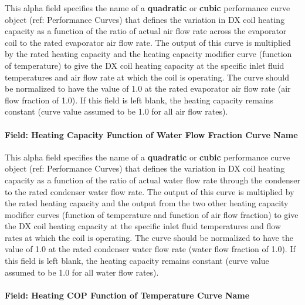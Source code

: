 This alpha field specifies the name of a \textbf{quadratic} or \textbf{cubic} performance curve object (ref: Performance Curves) that defines the variation in DX coil heating capacity as a function of the ratio of actual air flow rate across the evaporator coil to the rated evaporator air flow rate. The output of this curve is multiplied by the rated heating capacity and the heating capacity modifier curve (function of temperature) to give the DX coil heating capacity at the specific inlet fluid temperatures and air flow rate at which the coil is operating. The curve should be normalized to have the value of 1.0 at the rated evaporator air flow rate (air flow fraction of 1.0). If this field is left blank, the heating capacity remains constant (curve value assumed to be 1.0 for all air flow rates).

\paragraph{Field: Heating Capacity Function of Water Flow Fraction Curve Name}\label{field-heating-capacity-function-of-water-flow-fraction-curve-name}

This alpha field specifies the name of a \textbf{quadratic} or \textbf{cubic} performance curve object (ref: Performance Curves) that defines the variation in DX coil heating capacity as a function of the ratio of actual water flow rate through the condenser to the rated condenser water flow rate. The output of this curve is multiplied by the rated heating capacity and the output from the two other heating capacity modifier curves (function of temperature and function of air flow fraction) to give the DX coil heating capacity at the specific inlet fluid temperatures and flow rates at which the coil is operating. The curve should be normalized to have the value of 1.0 at the rated condenser water flow rate (water flow fraction of 1.0). If this field is left blank, the heating capacity remains constant (curve value assumed to be 1.0 for all water flow rates).

\paragraph{Field: Heating COP Function of Temperature Curve Name}\label{field-heating-cop-function-of-temperature-curve-name}

